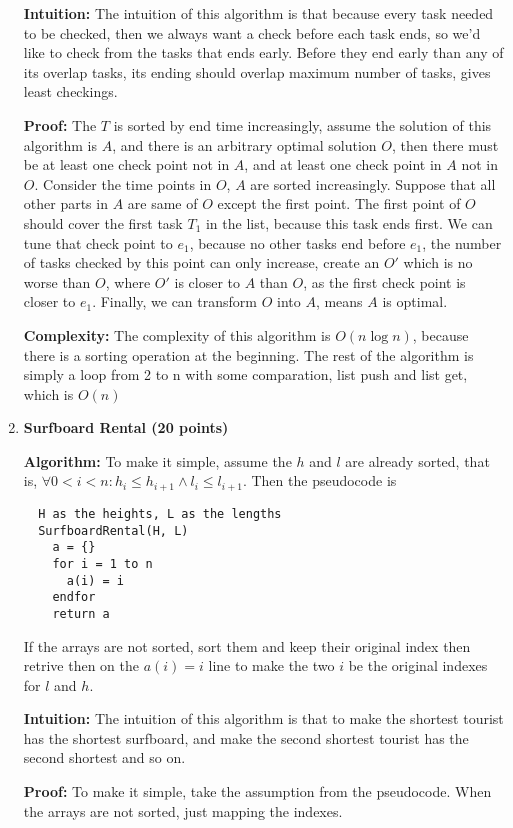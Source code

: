 \documentclass{article}
\begin{document}
\begin{enumerate}[topsep=0pt]
\textbf{Intuition:} The intuition of this algorithm is that because every task needed to be checked, then we always want a check before each task ends, so we'd like to check from the tasks that ends early. Before they end early than any of its overlap tasks, its ending should overlap maximum number of tasks, gives least checkings.

\textbf{Proof:} The $T$ is sorted by end time increasingly, assume the solution of this algorithm is $A$, and there is an arbitrary optimal solution $O$, then there must be at least one check point not in $A$, and at least one check point in $A$ not in $O$. Consider the time points in $O$, $A$ are sorted increasingly. Suppose that all other parts in $A$ are same of $O$ except the first point. The first point of $O$ should cover the first task $T_1$ in the list, because this task ends first. We can tune that check point to $e_1$, because no other tasks end before $e_1$, the number of tasks checked by this point can only increase, create an $O'$ which is no worse than $O$, where $O'$ is closer to $A$ than $O$, as the first check point is closer to $e_1$. Finally, we can transform $O$ into $A$, means $A$ is optimal.

\textbf{Complexity:} The complexity of this algorithm is $O(n\log{n})$, because there is a sorting operation at the beginning. The rest of the algorithm is simply a loop from 2 to n with some comparation, list push and list get, which is $O(n)$



\item \textbf{Surfboard Rental (20 points)} 

\textbf{Algorithm:} To make it simple, assume the $h$ and $l$ are already sorted, that is, $\forall 0<i<n:h_i\leq h_{i+1}\wedge l_i\leq l_{i+1}$. Then the pseudocode is
\begin{verbatim}
  H as the heights, L as the lengths
  SurfboardRental(H, L)
    a = {}
    for i = 1 to n
      a(i) = i
    endfor
    return a
\end{verbatim}
If the arrays are not sorted, sort them and keep their original index then retrive then on the $a(i)=i$ line to make the two $i$ be the original indexes for $l$ and $h$.

\textbf{Intuition:} The intuition of this algorithm is that to make the shortest tourist has the shortest surfboard, and make the second shortest tourist has the second shortest and so on.

\textbf{Proof:}
To make it simple, take the assumption from the pseudocode. When the arrays are not sorted, just mapping the indexes.


\end{enumerate}
\end{document}
